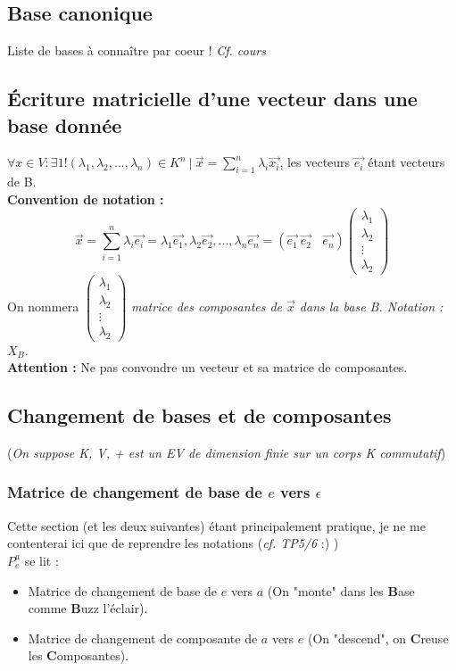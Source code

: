 \documentclass[12pt, a4paper]{article}
\begin{document}
\subsection{Base canonique}
Liste de bases à connaître par coeur ! \textit{Cf. cours}

\subsection{Écriture matricielle d'une vecteur dans une base donnée}
$\forall x \in V : \exists 1!(\lambda_{1}, \lambda_{2}, ..., \lambda_{n}) \in K^{n}\ |\ \vec{x} = \sum_{i=1}^{n} \lambda_{i}\vec{x_{i}}$, les vecteurs $\vec{e_{i}}$ étant vecteurs de B.\\
\textbf{Convention de notation :}\\
$$\vec{x} = \sum_{i=1}^{n}  \lambda_{i}\vec{e_{i}} = \lambda_{1}\vec{e_{1}}, \lambda_{2}\vec{e_{2}}, ..., \lambda_{n}\vec{e_{n}} = (\vec{e_{1}}\ \vec{e_{2}}\ \ \ \ \vec{e_{n}})\begin{pmatrix} 
\lambda_1 \\ 
\lambda_2 \\ 
\vdots\\ 
\lambda_2 \end{pmatrix}$$
On nommera $\begin{pmatrix} 
\lambda_1 \\ 
\lambda_2 \\ 
\vdots\\ 
\lambda_2 \end{pmatrix}$ \textit{matrice des composantes de $\vec{x}$ dans la base B. Notation : $X_B$}.
\\
\textbf{Attention :} Ne pas convondre un vecteur et sa matrice de 
composantes.


\subsection{Changement de bases et de composantes}
(\textit{On suppose K, V, + est un EV de dimension finie sur un corps K commutatif})\\
\subsubsection{Matrice de changement de base de $e$ vers $\epsilon$}
Cette section (et les deux suivantes) étant principalement pratique, je ne me contenterai ici que de reprendre les notations (\textit{cf. TP5/6} :) )\\
$P_e^a$ se lit :
\begin{itemize}
\item Matrice de changement de base de $e$ vers $a$ (On "monte" dans les \textbf{B}ase comme \textbf{B}uzz l'éclair).
\item Matrice de changement de composante de $a$ vers $e$ (On "descend", on \textbf{C}reuse les \textbf{C}omposantes).
\end{itemize}
\end{document}
